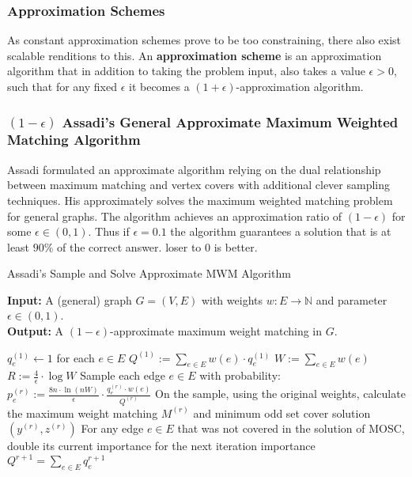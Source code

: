 \subsubsection{Approximation Schemes}

As constant approximation schemes prove to be too constraining, there also exist scalable renditions to this. An \textbf{approximation scheme} is an approximation algorithm that in addition to taking the problem input, also takes a value $\epsilon >0$, such that for any fixed $\epsilon$ it becomes a $(1+\epsilon)$-approximation algorithm.


\subsubsection{$(1-\epsilon)$ Assadi's General Approximate Maximum Weighted Matching Algorithm}

\noindent Assadi\cite{assadi} formulated an approximate algorithm relying on the dual relationship between maximum matching and vertex covers with additional clever sampling techniques. His approximately solves the maximum weighted matching problem for general graphs. The algorithm achieves an approximation ratio of $(1-\epsilon)$ for some $\epsilon \in (0,1)$. Thus if $\epsilon =0.1$ the algorithm guarantees a solution that is at least $90\%$ of the correct answer. loser to $0$ is better. 


\begin{algorithm}
\caption{Assadi's Sample and Solve Approximate MWM Algorithm}

\textbf{Input:} A (general) graph \( G = (V, E) \) with weights \( w : E \to \mathbb{N} \) and parameter \( \epsilon \in (0, 1) \). \\
\textbf{Output:} A \( (1 - \epsilon) \)-approximate maximum weight matching in \( G \).

\begin{algorithmic}[1]
\STATE $q_e^{(1)}\gets 1 $  for each $ e\in E$
\STATE $Q^{(1)} := \sum_{e\in E} w(e)\cdot q_e^{(1)}$
\STATE $W := \sum_{e\in E} w(e)$
\STATE $R := \frac{4}{\epsilon}\cdot \log{W}$
    \STATE Sample each edge $e\in E$ with probability:
    $p_e^{(r)} := \frac{8n\cdot \ln(nW)}{\epsilon} \cdot \frac{q^{(r)}_e \cdot w(e)}{Q^{(r)}} $
    \STATE On the sample, using the original weights, calculate the maximum weight matching $M^{(r)}$ and minimum odd set cover solution $(y^{(r)}, z^{(r)})$
    \STATE For any edge $e\in E$ that was not covered in the solution of MOSC, double its current importance for the next iteration importance
    \STATE $Q^{r+1} = \sum_{e\in E}q_e^{r+1}$

\ENDFOR
{} 
\end{algorithmic}
\end{algorithm}


